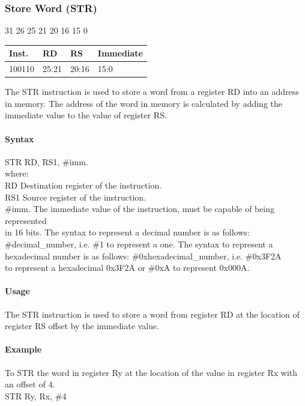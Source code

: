 \documentclass[12pt]{article}
\newcommand{\iTypeInstruction}[6]
{%
    \hspace{1.6cm}31 \hspace{1.15cm}26 \hspace{.05cm}25 \hspace{.8cm}21 \hspace{.05cm}20 \hspace{.8cm}16 \hspace{.05cm}15 \hspace{6.4cm}0
    \vspace{-.25cm}
    \begin{center}
        \begin{tabular}{ |p{1.8cm}|p{1.5cm}|p{1.5cm}|p{6.8cm}| }
            \hline
            \textbf{Inst.} & \textbf{RD} &  \textbf{RS} & \textbf{Immediate}\\
            \hline
            #1 & 25:21 & 20:16 &15:0\\
            \hline
        \end{tabular}
    \end{center}
    
    \noindent
    #2
    
    \paragraph{Syntax}
    \begin{flushleft}
    #3 RD, RS1, \#imm.\\
    \vspace{1em}        %
    where:\\
    \vspace{1em}
    RD  \hspace{3.6em} Destination register of the instruction.\\
    \vspace{1em}
    RS1  \hspace{3.35em} Source register of the instruction.\\
    \vspace{1em}
    \#imm.  \hspace{1.8em} The immediate value of the instruction, must be capable of being represented\\             \hspace{5.4em} in 16 bits. The syntax to represent a decimal number is as follows:\\
            \hspace{5.4em} \#decimal\_number, i.e. \#1 to represent a one. The syntax to represent a\\
            \hspace{5.4em} hexadecimal number is as follows: \#0xhexadecimal\_number, i.e. \#0x3F2A \\
            \hspace{5.4em} to represent a hexadecimal 0x3F2A or \#0xA to represent 0x000A.\\
    \end{flushleft}
    
    \paragraph{Usage}
    \begin{flushleft}
    #4\\
    \end{flushleft}
    \paragraph{Example}
    \begin{flushleft}
    #5\\
    \vspace{1em}
    #6
    \end{flushleft}}
\begin{document}

    \newpage
    \subsubsection{Store Word (STR)}
    
    \iTypeInstruction
    {100110}
    {The STR instruction is used to store a word from a register RD into an address in memory. The address of the word in memory is calculated by adding the immediate value to the value of register RS.}
    {STR}
    {The STR instruction is used to store a word from register RD at the location of register RS offset by the immediate value.}
    {To STR the word in register Ry at the location of the value in register Rx with an offset of 4.}
    {STR Ry, Rx, \#4}
    
    
    
\end{document}
